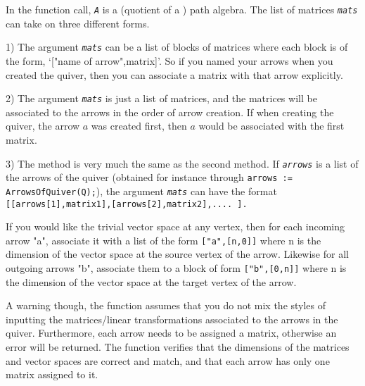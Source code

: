 \documentclass[a4paper,11pt]{report}
\begin{document}
{{{ In the function call, \mbox{\texttt{\slshape A}} is a (quotient of a ) path algebra. The list of matrices \mbox{\texttt{\slshape mats}} can take on three different forms.

 1) The argument \mbox{\texttt{\slshape mats}} can be a list of blocks of matrices where each block is of the form, `["name
of arrow",matrix]'. So if you named your arrows when you created the quiver,
then you can associate a matrix with that arrow explicitly.

 2) The argument \mbox{\texttt{\slshape mats}} is just a list of matrices, and the matrices will be associated to the arrows
in the order of arrow creation. If when creating the quiver, the arrow $a$ was created first, then $a$ would be associated with the first matrix.

 3) The method is very much the same as the second method. If \mbox{\texttt{\slshape arrows}} is a list of the arrows of the quiver (obtained for instance through \texttt{arrows := ArrowsOfQuiver(Q);}), the argument \mbox{\texttt{\slshape mats}} can have the format \texttt{[[arrows[1],matrix{\textunderscore}1],[arrows[2],matrix{\textunderscore}2],....
].}

 If you would like the trivial vector space at any vertex, then for each
incoming arrow "a", associate it with a list of the form \texttt{["a",[n,0]]} where n is the dimension of the vector space at the source vertex of the
arrow. Likewise for all outgoing arrows "b", associate them to a block of form \texttt{["b",[0,n]]} where n is the dimension of the vector space at the target vertex of the
arrow.

 A warning though, the function assumes that you do not mix the styles of
inputting the matrices/linear transformations associated to the arrows in the
quiver. Furthermore, each arrow needs to be assigned a matrix, otherwise an
error will be returned. The function verifies that the dimensions of the
matrices and vector spaces are correct and match, and that each arrow has only
one matrix assigned to it.

 }

}}
\end{document}
